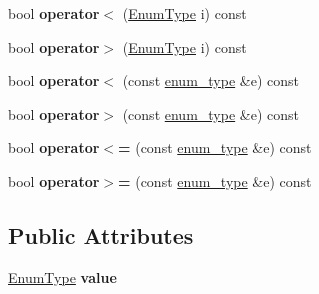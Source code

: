 \begin{DoxyCompactItemize}
\item 
\mbox{\label{classfc_1_1enum__type_a948ee1bc590e651c2d42dda538bb4522}} 
bool {\bfseries operator$<$} (\mbox{\hyperlink{struct_enum_type}{Enum\+Type}} i) const
\item 
\mbox{\label{classfc_1_1enum__type_a37bab60221d5bfaee42c0f03a7e6879a}} 
bool {\bfseries operator$>$} (\mbox{\hyperlink{struct_enum_type}{Enum\+Type}} i) const
\item 
\mbox{\label{classfc_1_1enum__type_a7c681516050d6eceac8a0c571f72500e}} 
bool {\bfseries operator$<$} (const \mbox{\hyperlink{classfc_1_1enum__type}{enum\+\_\+type}} \&e) const
\item 
\mbox{\label{classfc_1_1enum__type_ac6e9a19af6949253caa65b836a880f39}} 
bool {\bfseries operator$>$} (const \mbox{\hyperlink{classfc_1_1enum__type}{enum\+\_\+type}} \&e) const
\item 
\mbox{\label{classfc_1_1enum__type_a53f9929b8853c133181f296c8a6c6d58}} 
bool {\bfseries operator$<$=} (const \mbox{\hyperlink{classfc_1_1enum__type}{enum\+\_\+type}} \&e) const
\item 
\mbox{\label{classfc_1_1enum__type_a92d7cbbdb071304598bb632621ac3b0e}} 
bool {\bfseries operator$>$=} (const \mbox{\hyperlink{classfc_1_1enum__type}{enum\+\_\+type}} \&e) const
\end{DoxyCompactItemize}
\subsection*{Public Attributes}
\begin{DoxyCompactItemize}
\item 
\mbox{\label{classfc_1_1enum__type_a8b0e6540d17ce2ef92a0255af066f78f}} 
\mbox{\hyperlink{struct_enum_type}{Enum\+Type}} {\bfseries value}
\end{DoxyCompactItemize}
